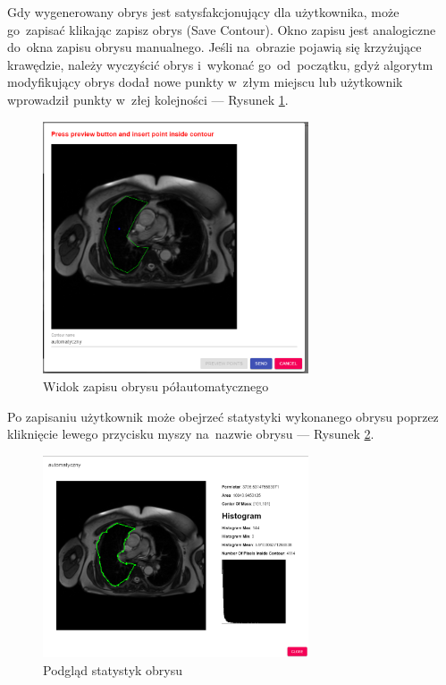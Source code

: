 \documentclass[a4paper,11pt,twoside,openright]{report}
\theoremstyle{definition}
\begin{document}
Gdy wygenerowany obrys jest satysfakcjonujący dla użytkownika, może go~zapisać
klikając zapisz obrys (Save Contour). Okno zapisu jest analogiczne do~okna zapisu
obrysu manualnego. Jeśli na~obrazie pojawią się krzyżujące krawędzie, należy
wyczyścić obrys i~wykonać go~od~początku, gdyż algorytm modyfikujący obrys dodał
nowe punkty w~złym miejscu lub użytkownik wprowadził punkty w~złej kolejności
--- Rysunek \ref{fig:14}.

\pagebreak

\begin{figure}[h!]
	\center
	\includegraphics[width=0.7\textwidth]{14}
	\caption{Widok zapisu obrysu półautomatycznego}
    	\label{fig:14}
\end{figure}

Po zapisaniu użytkownik może obejrzeć statystyki wykonanego obrysu poprzez
kliknięcie lewego przycisku myszy na~nazwie obrysu --- Rysunek \ref{fig:15}.

\begin{figure}[h!]
	\center
	\includegraphics[width=0.7\textwidth]{15}
	\caption{Podgląd statystyk obrysu}
    	\label{fig:15}
\end{figure}
\end{document}
